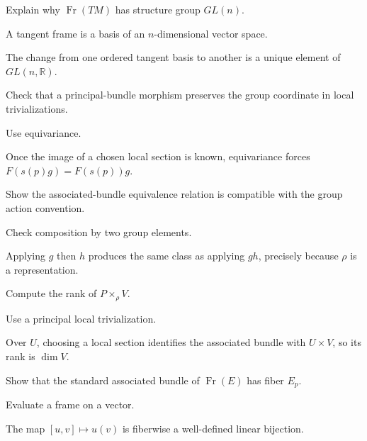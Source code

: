 \begin{exercise}\label{exr:vii08-15}
Explain why \(\operatorname{Fr}(TM)\) has structure group \(GL(n)\).
\end{exercise}
\begin{hint}
A tangent frame is a basis of an \(n\)-dimensional vector space.
\end{hint}
\begin{solution}
The change from one ordered tangent basis to another is a unique element of \(GL(n,\mathbb R)\).
\end{solution}

\begin{exercise}\label{exr:vii08-16}
Check that a principal-bundle morphism preserves the group coordinate in local trivializations.
\end{exercise}
\begin{hint}
Use equivariance.
\end{hint}
\begin{solution}
Once the image of a chosen local section is known, equivariance forces \(F(s(p)g)=F(s(p))g\).
\end{solution}

\begin{exercise}\label{exr:vii08-17}
Show the associated-bundle equivalence relation is compatible with the group action convention.
\end{exercise}
\begin{hint}
Check composition by two group elements.
\end{hint}
\begin{solution}
Applying \(g\) then \(h\) produces the same class as applying \(gh\), precisely because \(\rho\) is a representation.
\end{solution}

\begin{exercise}\label{exr:vii08-18}
Compute the rank of \(P\times_\rho V\).
\end{exercise}
\begin{hint}
Use a principal local trivialization.
\end{hint}
\begin{solution}
Over \(U\), choosing a local section identifies the associated bundle with \(U\times V\), so its rank is \(\dim V\).
\end{solution}

\begin{exercise}\label{exr:vii08-19}
Show that the standard associated bundle of \(\operatorname{Fr}(E)\) has fiber \(E_p\).
\end{exercise}
\begin{hint}
Evaluate a frame on a vector.
\end{hint}
\begin{solution}
The map \([u,v]\mapsto u(v)\) is fiberwise a well-defined linear bijection.
\end{solution}

